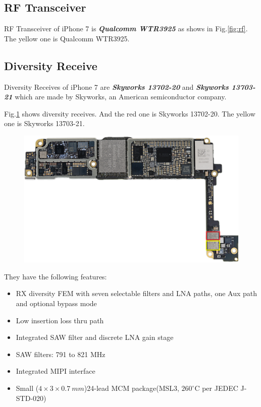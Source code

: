 \documentclass[conference]{IEEEtran}
\begin{document}
\subsection{RF Transceiver}
RF Transceiver of iPhone 7 is {\bfseries{\emph{Qualcomm WTR3925}}} as shows in Fig.\ref{fig:rf}. The yellow one is Qualcomm WTR3925.

\subsection{Diversity Receive}
Diversity Receives of iPhone 7 are {\bfseries{\emph{Skyworks 13702-20}}} and {\bfseries{\emph{Skyworks 13703-21}}} which are made by Skyworks, an American semiconductor company.

Fig.\ref{fig:Diversity_Receive} shows diversity receives. And the red one is Skyworks 13702-20. The yellow one is Skyworks 13703-21.
\begin{figure}[!ht]
	\centering
	\begin{center}
		\includegraphics*[width=0.8\linewidth]{Diversity_Receive}
		\caption{}
		\label{fig:Diversity_Receive}
	\end{center}
\end{figure}
They have the following features:\cite{Diversity_Receive.org}
\begin{itemize}
	\item RX diversity FEM with seven selectable filters and LNA paths, one Aux path and optional bypass mode 
	\item Low insertion loss thru path 
	\item Integrated SAW filter and discrete LNA gain stage
	\item SAW filters: 791 to 821 MHz
	\item Integrated MIPI interface
	\item Small ($4\times3\times0.7\ mm$)24-lead MCM package(MSL3, $260^{\circ}$C per JEDEC J-STD-020) 
\end{itemize}
\end{document}
